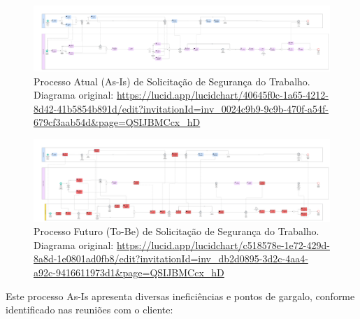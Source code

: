 \documentclass[12pt,a4paper]{article}
\begin{document}
\begin{landscape}
\begin{figure}[p]
\centering
\includegraphics[width=0.85\paperwidth, height=0.8\paperheight, keepaspectratio]{images/AS-IS.jpg}
\caption{Processo Atual (As-Is) de Solicitação de Segurança do Trabalho. \\ Diagrama original: \url{https://lucid.app/lucidchart/40645f0c-1a65-4212-8d42-41b5854b891d/edit?invitationId=inv_0024c9b9-9c9b-470f-a54f-679cf3aab54d&page=QSIJBMCcx_hD}}
\end{figure}
\end{landscape}

\begin{landscape}
\begin{figure}[p]
\centering
\includegraphics[width=0.85\paperwidth, height=0.8\paperheight, keepaspectratio]{images/TO-BE.jpg}
\caption{Processo Futuro (To-Be) de Solicitação de Segurança do Trabalho. \\ Diagrama original: \url{https://lucid.app/lucidchart/c518578e-1e72-429d-8a8d-1e0801ad0fb8/edit?invitationId=inv_db2d0895-3d2c-4aa4-a92c-9416611973d1&page=QSIJBMCcx_hD}}
\end{figure}
\end{landscape}

Este processo As-Is apresenta diversas ineficiências e pontos de gargalo, conforme identificado nas reuniões com o cliente:
\end{document}
